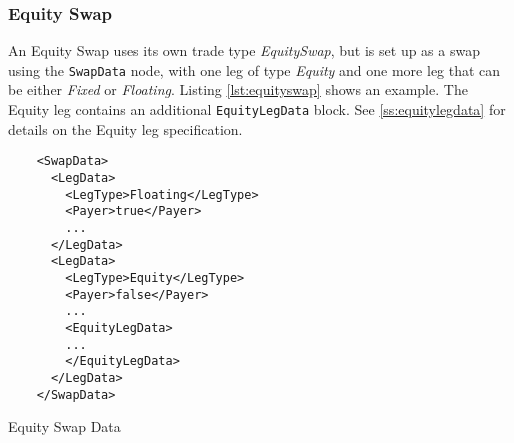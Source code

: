 \subsubsection{Equity Swap}

An Equity Swap uses its own trade type  \emph{EquitySwap}, but is set up as a swap using the {\tt SwapData} node, with one leg of type  \emph{Equity} and one more leg that can be either \emph{Fixed} or  \emph{Floating}. Listing \ref{lst:equityswap} shows an example. The
Equity leg contains an additional {\tt EquityLegData} block. See \ref{ss:equitylegdata} for details on the Equity leg specification.

\begin{listing}[H]
\begin{verbatim}
    <SwapData>
      <LegData>
        <LegType>Floating</LegType>
        <Payer>true</Payer>
        ...
      </LegData>
      <LegData>
        <LegType>Equity</LegType>
        <Payer>false</Payer>
        ...
        <EquityLegData>
        ...
        </EquityLegData>
      </LegData>
    </SwapData>
\end{verbatim}
\caption{Equity Swap Data}
\label{lst:equityswap}
\end{listing}